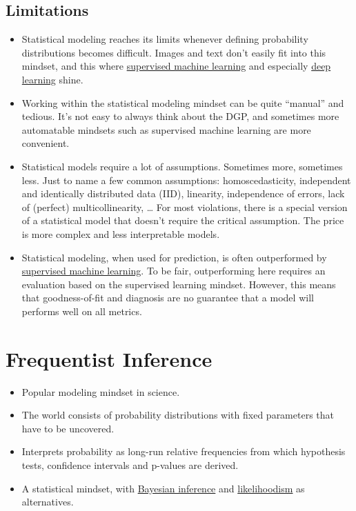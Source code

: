 \documentclass[
  10pt,
]{scrbook}
\providecommand{\tightlist}{%
  \setlength{\itemsep}{0pt}\setlength{\parskip}{0pt}}
\begin{document}
\hypertarget{limitations}{%
\section{Limitations}\label{limitations}}

\begin{itemize}
\tightlist
\item
  Statistical modeling reaches its limits whenever defining probability distributions becomes difficult. Images and text don't easily fit into this mindset, and this where \protect\hyperlink{supervised-ml}{supervised machine learning} and especially \protect\hyperlink{deep-learning}{deep learning} shine.
\item
  Working within the statistical modeling mindset can be quite ``manual'' and tedious. It's not easy to always think about the DGP, and sometimes more automatable mindsets such as supervised machine learning are more convenient.
\item
  Statistical models require a lot of assumptions. Sometimes more, sometimes less. Just to name a few common assumptions: homoscedasticity, independent and identically distributed data (IID), linearity, independence of errors, lack of (perfect) multicollinearity, \ldots{} For most violations, there is a special version of a statistical model that doesn't require the critical assumption. The price is more complex and less interpretable models.
\item
  Statistical modeling, when used for prediction, is often outperformed by \protect\hyperlink{supervised-ml}{supervised machine learning}. To be fair, outperforming here requires an evaluation based on the supervised learning mindset. However, this means that goodness-of-fit and diagnosis are no guarantee that a model will performs well on all metrics.
\end{itemize}

\hypertarget{frequentist-inference}{%
\chapter{Frequentist Inference}\label{frequentist-inference}}

\begin{itemize}
\tightlist
\item
  Popular modeling mindset in science.
\item
  The world consists of probability distributions with fixed parameters that have to be uncovered.
\item
  Interprets probability as long-run relative frequencies from which hypothesis tests, confidence intervals and p-values are derived.
\item
  A statistical mindset, with \protect\hyperlink{bayesian-inference}{Bayesian inference} and \protect\hyperlink{likelihoodism}{likelihoodism} as alternatives.
\end{itemize}
\end{document}
